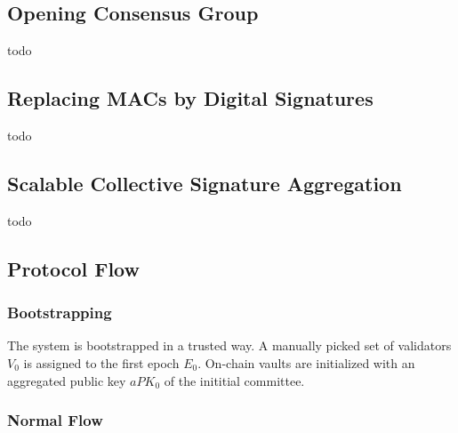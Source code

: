 \subsection{Opening Consensus Group}\label{subsec:opening-consensus-group}

todo

\subsection{Replacing MACs by Digital Signatures}\label{subsec:replacing-macs-by-digital-signatures}

todo

\subsection{Scalable Collective Signature Aggregation}\label{subsec:scalable-collective-signature-aggregation}

todo

\subsection{Protocol Flow}\label{subsec:protocol-flow}

\subsubsection{Bootstrapping}\label{subsubsec:bootstrapping}

The system is bootstrapped in a trusted way.
A manually picked set of validators $V_0$ is assigned to the first epoch $E_0$.
On-chain vaults are initialized with an aggregated public key $aPK_0$ of the inititial committee.

\subsubsection{Normal Flow}\label{subsubsec:normal-flow}

